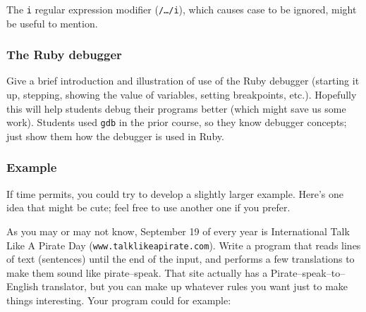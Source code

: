 \documentclass[12pt]{article}
\begin{document}
        The \texttt{i} regular expression modifier (\texttt{/\ldots/i}), which
      causes case to be ignored, might be useful to mention.
  
      \subsubsection{The Ruby debugger}
  
        Give a brief introduction and illustration of use of the Ruby debugger
      (starting it up, stepping, showing the value of variables, setting
      breakpoints, etc.).  Hopefully this will help students debug their
      programs better (which might save us some work).  Students used
      \texttt{gdb} in the prior course, so they know debugger concepts; just
      show them how the debugger is used in Ruby.
  
      \subsubsection{Example}
  
        If time permits, you could try to develop a slightly larger example.
      Here's one idea that might be cute; feel free to use another one if
      you prefer.
  
        As you may or may not know, September 19 of every year is
      International Talk Like A Pirate Day
      (\texttt{www.talklikeapirate.com}).  Write a program that reads
      lines of text (sentences) until the end of the input, and performs a
      few translations to make them sound like pirate--speak.  That site
      actually has a Pirate--speak--to--English translator, but you can make
      up whatever rules you want just to make things interesting.  Your
      program could for example:
  
      \vspace{-1.5mm}
  
\end{document}
